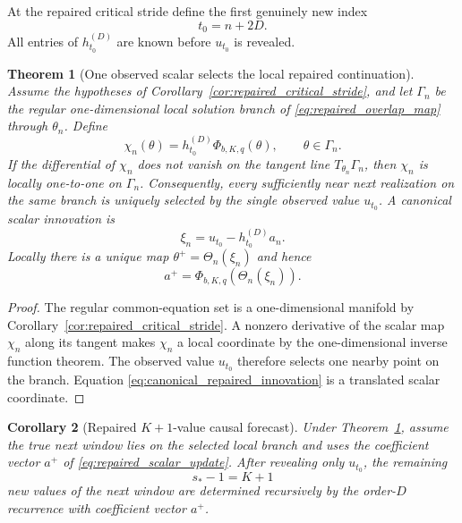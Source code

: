\documentclass[11pt]{amsart}
\numberwithin{equation}{section}
\theoremstyle{plain}
\newtheorem{theorem}{Theorem}[section]
\newtheorem{corollary}[theorem]{Corollary}
\theoremstyle{definition}
\theoremstyle{remark}
\begin{document}
At the repaired critical stride define the first genuinely new index
\begin{equation}t_0=n+2D.\label{eq:repaired_first_new_time}\end{equation}
All entries of $h^{(D)}_{t_0}$ are known before $u_{t_0}$ is revealed.

\begin{theorem}[One observed scalar selects the local repaired continuation]
\label{thm:repaired_one_sample}
Assume the hypotheses of Corollary~\ref{cor:repaired_critical_stride}, and let $\Gamma_n$ be the regular one-dimensional local solution branch of \eqref{eq:repaired_overlap_map} through $\theta_n$. Define
\begin{equation}\chi_n(\theta)=h^{(D)}_{t_0}\Phi_{b,K,q}(\theta),\qquad \theta\in\Gamma_n.\label{eq:repaired_observation_map}\end{equation}
If the differential of $\chi_n$ does not vanish on the tangent line $T_{\theta_n}\Gamma_n$, then $\chi_n$ is locally one-to-one on $\Gamma_n$. Consequently, every sufficiently near next realization on the same branch is uniquely selected by the single observed value $u_{t_0}$.
A canonical scalar innovation is
\begin{equation}
\boxed{\xi_n=u_{t_0}-h^{(D)}_{t_0}a_n.}
\label{eq:canonical_repaired_innovation}
\end{equation}
Locally there is a unique map $\theta^+=\Theta_n(\xi_n)$ and hence
\begin{equation}
a^+=\Phi_{b,K,q}\!\left(\Theta_n(\xi_n)\right).
\label{eq:repaired_scalar_update}
\end{equation}
\end{theorem}

\begin{proof}
The regular common-equation set is a one-dimensional manifold by Corollary~\ref{cor:repaired_critical_stride}. A nonzero derivative of the scalar map $\chi_n$ along its tangent makes $\chi_n$ a local coordinate by the one-dimensional inverse function theorem. The observed value $u_{t_0}$ therefore selects one nearby point on the branch. Equation \eqref{eq:canonical_repaired_innovation} is a translated scalar coordinate.
\end{proof}

\begin{corollary}[Repaired $K+1$-value causal forecast]
\label{cor:repaired_forecast}
Under Theorem~\ref{thm:repaired_one_sample}, assume the true next window lies on the selected local branch and uses the coefficient vector $a^+$ of \eqref{eq:repaired_scalar_update}. After revealing only $u_{t_0}$, the remaining
\begin{equation}s_*-1=K+1\label{eq:repaired_remaining_count}\end{equation}
new values of the next window are determined recursively by the order-$D$ recurrence with coefficient vector $a^+$.
\end{corollary}
\end{document}
